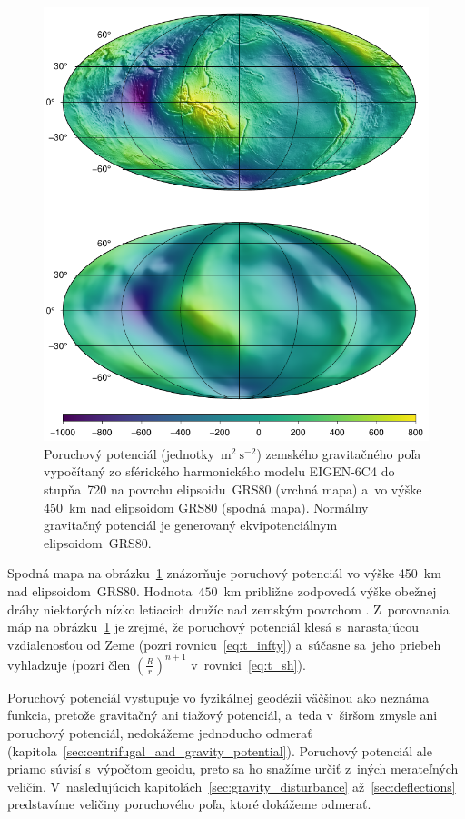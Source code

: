 \documentclass[a4paper, 12pt]{book}
\begin{document}
\begin{figure}[t]
\centering
\includegraphics{./fig-disturbing-potential.pdf}
\caption{Poruchový potenciál (jednotky~$\mathrm{m}^2 \ \mathrm{s}^{-2}$) 
zemského gravitačného poľa vypočítaný zo sférického harmonického modelu 
EIGEN-6C4 do stupňa~720 na povrchu elipsoidu~GRS80 (vrchná mapa) a~vo výške 
450~km nad elipsoidom GRS80 (spodná mapa).  Normálny gravitačný potenciál je 
generovaný ekvipotenciálnym elipsoidom~GRS80.}
\label{fig:disturbing_potential}
\end{figure}

Spodná mapa na obrázku~\ref{fig:disturbing_potential} znázorňuje poruchový 
potenciál vo výške 450~km nad elipsoidom~GRS80.  Hodnota~$450$~km približne 
zodpovedá výške obežnej dráhy niektorých nízko letiacich družíc nad zemským 
povrchom \parencite[pozri napríklad][]{MoritzPhysicalGeodesy}.  Z~porovnania 
máp na obrázku~\ref{fig:disturbing_potential} je zrejmé, že poruchový potenciál 
klesá s~narastajúcou vzdialenosťou od Zeme (pozri rovnicu~\ref{eq:t_infty}) 
a~súčasne sa~jeho priebeh vyhladzuje (pozri člen $\left( \frac{R}{r} \right)^{n 
+ 1}$ v~rovnici~\ref{eq:t_sh}).

Poruchový potenciál vystupuje vo fyzikálnej geodézii väčšinou ako neznáma 
funkcia, pretože gravitačný ani tiažový potenciál, a~teda v~širšom zmysle ani 
poruchový potenciál, nedokážeme jednoducho odmerať 
(kapitola~\ref{sec:centrifugal_and_gravity_potential}).  Poruchový potenciál 
ale priamo súvisí s~výpočtom geoidu, preto sa ho snažíme určiť z~iných 
merateľných veličín.  V~nasledujúcich kapitolách~\ref{sec:gravity_disturbance} 
až~\ref{sec:deflections} predstavíme veličiny poruchového poľa, ktoré dokážeme 
odmerať.
\end{document}
